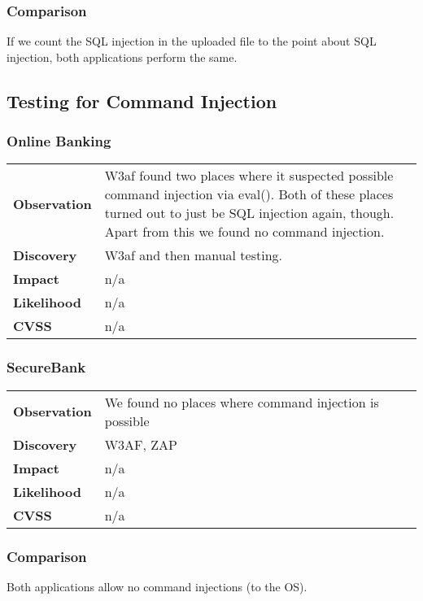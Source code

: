 \subsubsection*{Comparison}
If we count the SQL injection in the uploaded file to the point about SQL injection, both applications perform the same.

\clearpage


\subsection{Testing for Command Injection}

\subsubsection*{Online Banking}

\begin{tabular}{l|p{10cm}}
\textbf{Observation} & W3af found two places where it suspected possible command injection via eval(). Both of these places turned out to just be SQL injection again, though. Apart from this we found no command injection.\\
\textbf{Discovery} & W3af and then manual testing.\\
\textbf{Impact} & n/a \\
\textbf{Likelihood} & n/a \\
\textbf{CVSS} & n/a \\
\end{tabular}

\subsubsection*{SecureBank}

\begin{tabular}{l|p{10cm}}
\textbf{Observation} & We found no places where command injection is possible\\
\textbf{Discovery} & W3AF, ZAP\\
\textbf{Impact} & n/a \\
\textbf{Likelihood} & n/a \\
\textbf{CVSS} & n/a \\
\end{tabular}

\subsubsection*{Comparison}
Both applications allow no command injections (to the OS).

